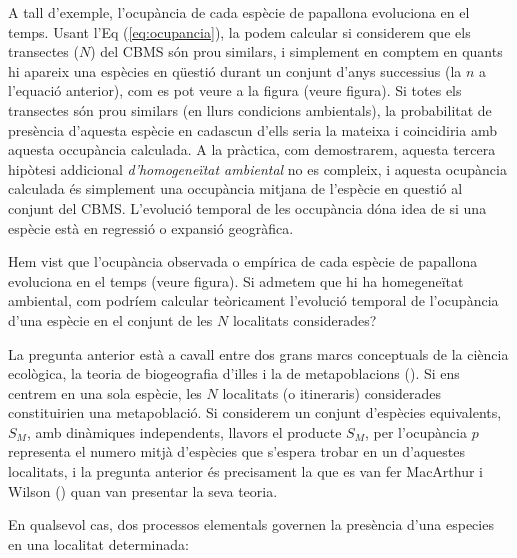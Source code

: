 \documentclass{article}
\begin{document}
A tall d'exemple, l'ocup\`ancia de cada esp\`ecie de papallona evoluciona en el temps. Usant l'Eq (\ref{eq:ocupancia}), la podem calcular si considerem que els transectes ($N$) del CBMS s\'on prou similars, i simplement en comptem en quants hi apareix una esp\`ecies en q\"uesti\'o durant un conjunt d'anys successius (la $n$ a l'equaci\'o anterior), com es pot veure a la figura (veure figura). Si totes els transectes s\'on prou similars (en llurs condicions ambientals), la probabilitat de pres\`encia d'aquesta esp\`ecie en cadascun d'ells seria la mateixa i coincidiria amb aquesta occup\`ancia calculada. A la pr\`actica, com demostrarem, aquesta tercera hip\`otesi addicional {\it d'homogene\"itat ambiental} no es compleix, i aquesta ocup\`ancia calculada \'es simplement una occup\`ancia mitjana de l'esp\`ecie en questi\'o al conjunt del CBMS. L'evoluci\'o temporal de les occup\`ancia d\'ona idea de si una esp\`ecie est\`a en regressi\'o o expansi\'o geogr\`afica. 
\smallskip

Hem vist que l'ocup\`ancia observada o emp\'irica de cada esp\`ecie de papallona evoluciona en el temps (veure figura).  Si admetem que hi ha homegene\"itat ambiental, com podr\'iem calcular te\`oricament l'evoluci\'o temporal de l'ocup\`ancia d'una esp\`ecie en el conjunt de les $N$ localitats considerades? 
\smallskip

La pregunta anterior est\`a a cavall entre dos grans marcs conceptuals de la ci\`encia ecol\`ogica, la teoria de biogeografia d'illes i la de metapoblacions (\cite{gotelli_2008}). Si ens centrem en una sola esp\`ecie, les $N$ localitats (o itineraris) considerades constituirien una metapoblaci\'o. Si considerem un conjunt d'esp\`ecies equivalents, $S_M$, amb din\`amiques independents, llavors el producte $S_M$, per l'ocup\`ancia $p$ representa el numero mitj\`a d'esp\`ecies que s'espera trobar en un d'aquestes localitats, i la pregunta anterior \'es precisament la que es van fer MacArthur i Wilson (\citeyear{MacArthurWilson67}) quan van presentar la seva teoria. 
\smallskip

En qualsevol cas, dos processos elementals governen la pres\`encia d'una especies en una localitat determinada: 
\end{document}
